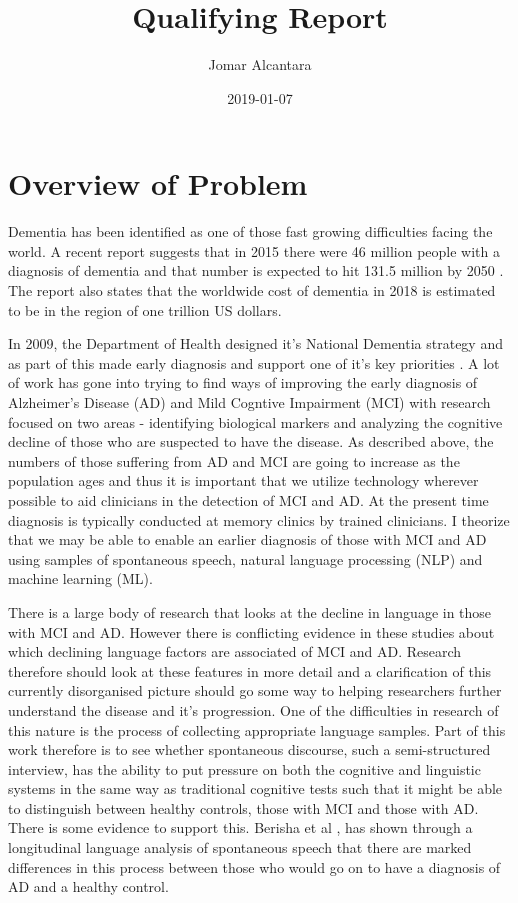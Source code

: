 \documentclass[12pt, twoside, a4paper]{article}
\title{Qualifying Report}
\date{2019-01-07}
\author{Jomar Alcantara}
\begin{document}
\maketitle
\newpage
\begin{abstract}

\end{abstract}
\tableofcontents
\newpage
\listoftables
\newpage
\listoffigures
\newpage
\section{Overview of Problem}
Dementia has been identified as one of those fast growing difficulties facing the world. A recent report suggests that in 2015 there were 46 million people with a diagnosis of dementia and that number is expected to hit 131.5 million by 2050 \cite{Prince2015}. The report also states that the worldwide cost of dementia in 2018 is estimated to be in the region of one trillion US dollars.
\par
In 2009, the Department of Health designed it's National Dementia strategy and as part of this made early diagnosis and support one of it's key priorities \cite{Health2009}. A lot of work has gone into trying to find ways of improving the early diagnosis of Alzheimer's Disease (AD) and Mild Cogntive Impairment (MCI) with research focused on two areas - identifying biological markers and analyzing the cognitive decline of those who are suspected to have the disease\cite{Taler2008}. As described above, the numbers of those suffering from AD and MCI are going to increase as the population ages \cite{Prince2015} and thus it is important that we utilize technology wherever possible to aid clinicians in the detection of MCI and AD. At the present time diagnosis is typically conducted at memory clinics by trained clinicians\cite{Boschi2017}. I theorize that we may be able to enable an earlier diagnosis of those with MCI and AD using samples of spontaneous speech, natural language processing (NLP) and machine learning (ML).
\par
There is a large body of research that looks at the decline in language in those with MCI and AD\cite{Taler2008, Boschi2017}. However there is conflicting evidence in these studies about which declining language factors are associated of MCI and AD\cite{Taler2008, Boschi2017}. Research therefore should look at these features in more detail and a clarification of this currently disorganised picture should go some way to helping researchers further understand the disease and it's progression. One of the difficulties in research of this nature is the process of collecting appropriate language samples. Part of this work therefore is to see whether spontaneous discourse, such a semi-structured interview, has the ability to put pressure on both the cognitive and linguistic systems in the same way as traditional cognitive tests such that it might be able to distinguish between healthy controls, those with MCI and those with AD. There is some evidence to support this. Berisha et al \cite{Berisha2015}, has shown through a longitudinal language analysis of spontaneous speech that there are marked differences in this process between those who would go on to have a diagnosis of AD and a healthy control. 
\end{document}
